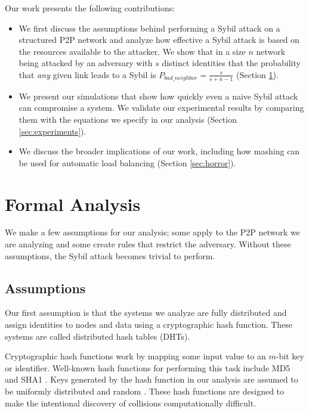 \documentclass[11pt,conference]{IEEEtran}
\begin{document}
Our work presents the following contributions:
\begin{itemize}
    \item We first discuss the assumptions behind performing a Sybil attack on a structured P2P network and analyze how effective a Sybil attack is based on the resources available to the attacker.
    We show that in a size $n$ network being attacked by an adversary with $s$ distinct identities that the probability that \textit{any} given link leads to a Sybil is $P_{bad\_neighbor} =  \frac{s}{s+ n - 1}$ (Section \ref{sec:analysis}). 
    \item We present our simulations that show how quickly even a naive Sybil attack can compromise a system. 
    We validate our experimental results by comparing them with the equations we specify in our analysis (Section \ref{sec:experiments}).
    \item We discuss the broader implications of our work, including how mashing can be used for automatic load balancing (Section \ref{sec:horror}).

\end{itemize}

\section{Formal Analysis}
\label{sec:analysis}

We make a few assumptions for our analysis; some apply to the P2P network we are analyzing and some create rules that restrict the adversary.
Without these assumptions, the Sybil attack becomes trivial to perform.



\subsection{Assumptions}
\label{sec:assume}

Our first assumption is that the systems we analyze are fully distributed and assign identities to nodes and data using a cryptographic hash function.
These systems are called distributed hash tables (DHTs).

Cryptographic hash functions work by mapping some input value to an $m$-bit key or identifier.
Well-known hash functions for performing this task include MD5 \cite{md5} and SHA1 \cite{sha1}.
Keys generated by the hash function in our analysis are assumed to be uniformly distributed and random \cite{bellare2004hash}. 
These hash functions are designed to make the intentional  discovery of collisions computationally difficult.
\end{document}
